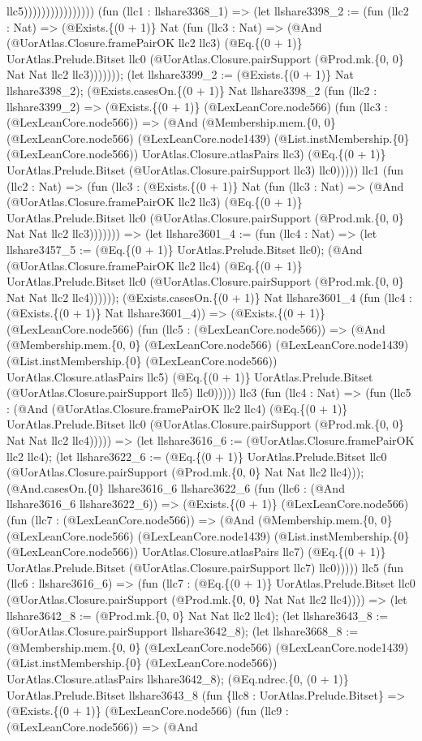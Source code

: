 \documentclass[11pt]{article}
\begin{document}
llc5)))))))))))))))) (fun (llc1 : llshare3368\_1) => (let llshare3398\_2 := (fun (llc2 : Nat) => (@Exists.\{(0 + 1)\} Nat (fun (llc3 : Nat) => (@And (@UorAtlas.Closure.framePairOK llc2 llc3) (@Eq.\{(0 + 1)\} UorAtlas.Prelude.Bitset llc0 (@UorAtlas.Closure.pairSupport (@Prod.mk.\{0, 0\} Nat Nat llc2 llc3))))))); (let llshare3399\_2 := (@Exists.\{(0 + 1)\} Nat llshare3398\_2); (@Exists.casesOn.\{(0 + 1)\} Nat llshare3398\_2 (fun (llc2 : llshare3399\_2) => (@Exists.\{(0 + 1)\} (@LexLeanCore.node566) (fun (llc3 : (@LexLeanCore.node566)) => (@And (@Membership.mem.\{0, 0\} (@LexLeanCore.node566) (@LexLeanCore.node1439) (@List.instMembership.\{0\} (@LexLeanCore.node566)) UorAtlas.Closure.atlasPairs llc3) (@Eq.\{(0 + 1)\} UorAtlas.Prelude.Bitset (@UorAtlas.Closure.pairSupport llc3) llc0))))) llc1 (fun (llc2 : Nat) => (fun (llc3 : (@Exists.\{(0 + 1)\} Nat (fun (llc3 : Nat) => (@And (@UorAtlas.Closure.framePairOK llc2 llc3) (@Eq.\{(0 + 1)\} UorAtlas.Prelude.Bitset llc0 (@UorAtlas.Closure.pairSupport (@Prod.mk.\{0, 0\} Nat Nat llc2 llc3))))))) => (let llshare3601\_4 := (fun (llc4 : Nat) => (let llshare3457\_5 := (@Eq.\{(0 + 1)\} UorAtlas.Prelude.Bitset llc0); (@And (@UorAtlas.Closure.framePairOK llc2 llc4) (@Eq.\{(0 + 1)\} UorAtlas.Prelude.Bitset llc0 (@UorAtlas.Closure.pairSupport (@Prod.mk.\{0, 0\} Nat Nat llc2 llc4)))))); (@Exists.casesOn.\{(0 + 1)\} Nat llshare3601\_4 (fun (llc4 : (@Exists.\{(0 + 1)\} Nat llshare3601\_4)) => (@Exists.\{(0 + 1)\} (@LexLeanCore.node566) (fun (llc5 : (@LexLeanCore.node566)) => (@And (@Membership.mem.\{0, 0\} (@LexLeanCore.node566) (@LexLeanCore.node1439) (@List.instMembership.\{0\} (@LexLeanCore.node566)) UorAtlas.Closure.atlasPairs llc5) (@Eq.\{(0 + 1)\} UorAtlas.Prelude.Bitset (@UorAtlas.Closure.pairSupport llc5) llc0))))) llc3 (fun (llc4 : Nat) => (fun (llc5 : (@And (@UorAtlas.Closure.framePairOK llc2 llc4) (@Eq.\{(0 + 1)\} UorAtlas.Prelude.Bitset llc0 (@UorAtlas.Closure.pairSupport (@Prod.mk.\{0, 0\} Nat Nat llc2 llc4))))) => (let llshare3616\_6 := (@UorAtlas.Closure.framePairOK llc2 llc4); (let llshare3622\_6 := (@Eq.\{(0 + 1)\} UorAtlas.Prelude.Bitset llc0 (@UorAtlas.Closure.pairSupport (@Prod.mk.\{0, 0\} Nat Nat llc2 llc4))); (@And.casesOn.\{0\} llshare3616\_6 llshare3622\_6 (fun (llc6 : (@And llshare3616\_6 llshare3622\_6)) => (@Exists.\{(0 + 1)\} (@LexLeanCore.node566) (fun (llc7 : (@LexLeanCore.node566)) => (@And (@Membership.mem.\{0, 0\} (@LexLeanCore.node566) (@LexLeanCore.node1439) (@List.instMembership.\{0\} (@LexLeanCore.node566)) UorAtlas.Closure.atlasPairs llc7) (@Eq.\{(0 + 1)\} UorAtlas.Prelude.Bitset (@UorAtlas.Closure.pairSupport llc7) llc0))))) llc5 (fun (llc6 : llshare3616\_6) => (fun (llc7 : (@Eq.\{(0 + 1)\} UorAtlas.Prelude.Bitset llc0 (@UorAtlas.Closure.pairSupport (@Prod.mk.\{0, 0\} Nat Nat llc2 llc4)))) => (let llshare3642\_8 := (@Prod.mk.\{0, 0\} Nat Nat llc2 llc4); (let llshare3643\_8 := (@UorAtlas.Closure.pairSupport llshare3642\_8); (let llshare3668\_8 := (@Membership.mem.\{0, 0\} (@LexLeanCore.node566) (@LexLeanCore.node1439) (@List.instMembership.\{0\} (@LexLeanCore.node566)) UorAtlas.Closure.atlasPairs llshare3642\_8); (@Eq.ndrec.\{0, (0 + 1)\} UorAtlas.Prelude.Bitset llshare3643\_8 (fun \{llc8 : UorAtlas.Prelude.Bitset\} => (@Exists.\{(0 + 1)\} (@LexLeanCore.node566) (fun (llc9 : (@LexLeanCore.node566)) => (@And 
\end{document}
